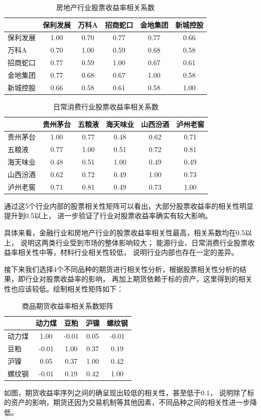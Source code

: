 \documentclass[a4paper,12pt]{article}
\begin{document}
\begin{table}[H]
\centering
\caption{房地产行业股票收益率相关系数}
\begin{tabular}{lccccc}
\toprule
 & 保利发展 & 万科A & 招商蛇口 & 金地集团 & 新城控股 \\
\midrule
保利发展 & 1.00 & 0.70 & 0.77 & 0.77 & 0.66 \\
万科A & 0.70 & 1.00 & 0.59 & 0.68 & 0.58 \\
招商蛇口 & 0.77 & 0.59 & 1.00 & 0.67 & 0.61 \\
金地集团 & 0.77 & 0.68 & 0.67 & 1.00 & 0.58 \\
新城控股 & 0.66 & 0.58 & 0.61 & 0.58 & 1.00 \\
\bottomrule
\end{tabular}
\end{table}

\begin{table}[H]
\centering
\caption{日常消费行业股票收益率相关系数}
\begin{tabular}{lccccc}
\toprule
 & 贵州茅台 & 五粮液 & 海天味业 & 山西汾酒 & 泸州老窖 \\
\midrule
贵州茅台 & 1.00 & 0.77 & 0.48 & 0.62 & 0.71 \\
五粮液 & 0.77 & 1.00 & 0.51 & 0.72 & 0.81 \\
海天味业 & 0.48 & 0.51 & 1.00 & 0.49 & 0.49 \\
山西汾酒 & 0.62 & 0.72 & 0.49 & 1.00 & 0.73 \\
泸州老窖 & 0.71 & 0.81 & 0.49 & 0.73 & 1.00 \\
\bottomrule
\end{tabular}
\end{table}

通过这5个行业内部的股票相关性矩阵可以看出，大部分股票收益率的相关性明显提升到0.5以上，
进一步验证了行业对股票收益率确实有较大影响。

具体来看，金融行业和房地产行业的股票收益率相关性最高，相关系数均在0.5以上，
说明这两类行业受到市场的整体影响较大；
能源行业、日常消费行业股票收益率相关性中等，材料行业相关性较低，
说明行业内部也存在一定的差异。

接下来我们选择4个不同品种的期货进行相关性分析，根据股票相关性分析的结果，即行业对股票收益率的影响，
再加上期货依赖于标的资产，这里得到的相关性也应该较低。绘制相关性矩阵如下：

\begin{table}[H]
\centering
\caption{商品期货收益率相关系数矩阵}
\begin{tabular}{lcccc}
\toprule
 & 动力煤 & 豆粕 & 沪镍 & 螺纹钢 \\
\midrule
动力煤 & 1.00 & -0.01 & 0.05 & -0.01 \\
豆粕 & -0.01 & 1.00 & 0.37 & 0.19 \\
沪镍 & 0.05 & 0.37 & 1.00 & 0.42 \\
螺纹钢 & -0.01 & 0.19 & 0.42 & 1.00 \\
\bottomrule
\end{tabular}
\end{table}

如图，期货收益率序列之间的确呈现出较低的相关性，甚至低于0.1，
说明除了标的资产的影响，期货还因为交易机制等其他因素，不同品种之间的相关性进一步降低。
\end{document}
